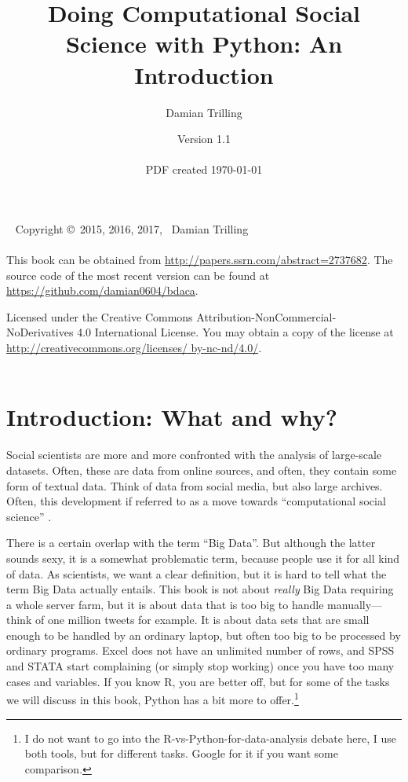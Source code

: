 \documentclass[a4paper,12pt]{book}
\title{Doing Computational Social Science with Python: An Introduction}
\author{Damian Trilling}
\date{Version 1.1\\ ~ \\  \footnotesize{PDF created \today}}
\begin{document}
\frontmatter

\maketitle

\newpage

{~\vfill
\thispagestyle{empty}
\setlength{\parindent}{0pt}
\setlength{\parskip}{\baselineskip}
Copyright \copyright\ 2015, 2016, 2017, \the\year\ Damian Trilling\\
\vspace{.25cm} \\
This book can be obtained from \url{http://papers.ssrn.com/abstract=2737682}. The source code of the most recent version can be found at \url{https://github.com/damian0604/bdaca}.


\par Licensed under the Creative Commons Attribution-NonCommercial-NoDerivatives 4.0 International License. You may obtain a copy of the license at \url{http://creativecommons.org/licenses/ by-nc-nd/4.0/}. \\
\vspace{.5cm} \\
\ccbyncnd

}


\newpage

\tableofcontents


\chapter{Introduction: What and why?}

Social scientists are more and more confronted with the analysis of large-scale datasets. Often, these are data from online sources, and often, they contain some form of textual data. Think of data from social media, but also large archives. Often, this development if referred to as a move towards ``computational social science'' \citep{Lazer2009,Kitchin2014}.

There is a certain overlap with the term ``Big Data''. But although the latter sounds sexy, it is a somewhat problematic term, because people use it for all kind of data. As scientists, we want a clear definition, but it is hard to tell what the term Big Data actually entails. This book is not about \emph{really} Big Data requiring a whole server farm, but it is about data that is too big to handle manually---think of one million tweets for example. It is about data sets that are small enough to be handled by an ordinary laptop, but often too big to be processed by ordinary programs. Excel does not have an unlimited number of rows, and SPSS and STATA start complaining (or simply stop working) once you have too many cases and variables. If you know R, you are better off, but for some of the tasks we will discuss in this book, Python has a bit more to offer.\footnote{I do not want to go into the R-vs-Python-for-data-analysis debate here, I use both tools, but for different tasks. Google for it if you want some comparison.}  
\end{document}
